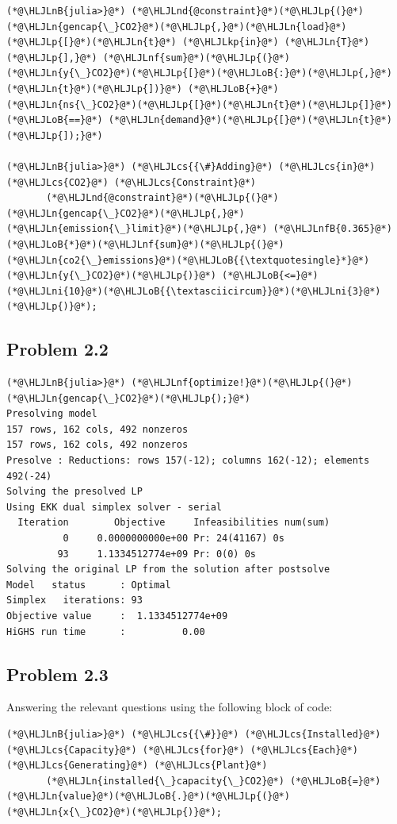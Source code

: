 \documentclass[12pt,a4paper]{article}
\newcommand{\HLJLkp}[1]{\textcolor[RGB]{148,91,176}{\textbf{#1}}}
\newcommand{\HLJLn}[1]{#1}
\newcommand{\HLJLnd}[1]{\textcolor[RGB]{214,102,97}{#1}}
\newcommand{\HLJLnf}[1]{\textcolor[RGB]{66,102,213}{#1}}
\newcommand{\HLJLnB}[1]{\textcolor[RGB]{59,151,46}{#1}}
\newcommand{\HLJLnfB}[1]{\textcolor[RGB]{59,151,46}{#1}}
\newcommand{\HLJLni}[1]{\textcolor[RGB]{59,151,46}{#1}}
\newcommand{\HLJLoB}[1]{\textcolor[RGB]{102,102,102}{\textbf{#1}}}
\newcommand{\HLJLp}[1]{#1}
\newcommand{\HLJLcs}[1]{\textcolor[RGB]{153,153,119}{\textit{#1}}}
\begin{document}
\begin{lstlisting}
(*@\HLJLnB{julia>}@*) (*@\HLJLnd{@constraint}@*)(*@\HLJLp{(}@*)(*@\HLJLn{gencap{\_}CO2}@*)(*@\HLJLp{,}@*)(*@\HLJLn{load}@*)(*@\HLJLp{[}@*)(*@\HLJLn{t}@*) (*@\HLJLkp{in}@*) (*@\HLJLn{T}@*)(*@\HLJLp{],}@*) (*@\HLJLnf{sum}@*)(*@\HLJLp{(}@*)(*@\HLJLn{y{\_}CO2}@*)(*@\HLJLp{[}@*)(*@\HLJLoB{:}@*)(*@\HLJLp{,}@*)(*@\HLJLn{t}@*)(*@\HLJLp{])}@*) (*@\HLJLoB{+}@*) (*@\HLJLn{ns{\_}CO2}@*)(*@\HLJLp{[}@*)(*@\HLJLn{t}@*)(*@\HLJLp{]}@*) (*@\HLJLoB{==}@*) (*@\HLJLn{demand}@*)(*@\HLJLp{[}@*)(*@\HLJLn{t}@*)(*@\HLJLp{]);}@*)

(*@\HLJLnB{julia>}@*) (*@\HLJLcs{{\#}Adding}@*) (*@\HLJLcs{in}@*) (*@\HLJLcs{CO2}@*) (*@\HLJLcs{Constraint}@*)
       (*@\HLJLnd{@constraint}@*)(*@\HLJLp{(}@*)(*@\HLJLn{gencap{\_}CO2}@*)(*@\HLJLp{,}@*)(*@\HLJLn{emission{\_}limit}@*)(*@\HLJLp{,}@*) (*@\HLJLnfB{0.365}@*)(*@\HLJLoB{*}@*)(*@\HLJLnf{sum}@*)(*@\HLJLp{(}@*)(*@\HLJLn{co2{\_}emissions}@*)(*@\HLJLoB{{\textquotesingle}*}@*)(*@\HLJLn{y{\_}CO2}@*)(*@\HLJLp{)}@*) (*@\HLJLoB{<=}@*) (*@\HLJLni{10}@*)(*@\HLJLoB{{\textasciicircum}}@*)(*@\HLJLni{3}@*)(*@\HLJLp{)}@*);
\end{lstlisting}

\subsection{Problem 2.2}

\begin{lstlisting}
(*@\HLJLnB{julia>}@*) (*@\HLJLnf{optimize!}@*)(*@\HLJLp{(}@*)(*@\HLJLn{gencap{\_}CO2}@*)(*@\HLJLp{);}@*)
Presolving model
157 rows, 162 cols, 492 nonzeros
157 rows, 162 cols, 492 nonzeros
Presolve : Reductions: rows 157(-12); columns 162(-12); elements 492(-24)
Solving the presolved LP
Using EKK dual simplex solver - serial
  Iteration        Objective     Infeasibilities num(sum)
          0     0.0000000000e+00 Pr: 24(41167) 0s
         93     1.1334512774e+09 Pr: 0(0) 0s
Solving the original LP from the solution after postsolve
Model   status      : Optimal
Simplex   iterations: 93
Objective value     :  1.1334512774e+09
HiGHS run time      :          0.00
\end{lstlisting}

\subsection{Problem 2.3}
Answering the relevant questions using the following block of code:


\begin{lstlisting}
(*@\HLJLnB{julia>}@*) (*@\HLJLcs{{\#}}@*) (*@\HLJLcs{Installed}@*) (*@\HLJLcs{Capacity}@*) (*@\HLJLcs{for}@*) (*@\HLJLcs{Each}@*) (*@\HLJLcs{Generating}@*) (*@\HLJLcs{Plant}@*)
       (*@\HLJLn{installed{\_}capacity{\_}CO2}@*) (*@\HLJLoB{=}@*) (*@\HLJLn{value}@*)(*@\HLJLoB{.}@*)(*@\HLJLp{(}@*)(*@\HLJLn{x{\_}CO2}@*)(*@\HLJLp{)}@*);
\end{lstlisting}
\end{document}
